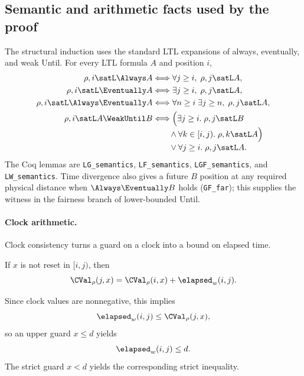 \subsection{Semantic and arithmetic facts used by the proof}
\label{subsec:main-proof-facts}
The structural induction uses the standard LTL expansions of always,
eventually, and weak Until. For every LTL formula $A$ and position $i$,
\begin{align}
\rho,i\satL \Always A &\Longleftrightarrow
  \forall j\ge i,\;\rho,j\satL A,\nonumber\\
\rho,i\satL \Eventually A &\Longleftrightarrow
  \exists j\ge i,\;\rho,j\satL A,\nonumber\\
\rho,i\satL \Always\Eventually A &\Longleftrightarrow
  \forall n\ge i\;\exists j\ge n,\;\rho,j\satL A,\label{eq:main-sem-GF}\\
\rho,i\satL A\WeakUntil B &\Longleftrightarrow
  \Bigl(\exists j\ge i.\;\rho,j\satL B\\[-1mm]
  &\qquad\land\forall k\in[i,j).\;\rho,k\satL A\Bigr)\nonumber\\[-1mm]
  &\qquad\lor\forall j\ge i.\;\rho,j\satL A.\nonumber
\end{align}
The Coq lemmas are \texttt{LG\_semantics}, \texttt{LF\_semantics},
\texttt{LGF\_semantics}, and \texttt{LW\_semantics}. Time divergence also
gives a future $B$ position at any required physical distance when
$\Always\Eventually B$ holds (\texttt{GF\_far}); this supplies the witness
in the fairness branch of lower-bounded Until.

\paragraph{Clock arithmetic.}
Clock consistency turns a guard on a clock into a bound on elapsed time.
\begin{lemma}
\label{lem:clock-accumulation}
If $x$ is not reset in $[i,j)$, then
\[
\CVal_\rho(j,x)=\CVal_\rho(i,x)+\elapsed_w(i,j).
\]
\end{lemma}
Since clock values are nonnegative, this implies
\begin{equation}
\elapsed_w(i,j)\le\CVal_\rho(j,x),
\label{eq:main-preservation-elapsed}
\end{equation}
so an upper guard $x\le d$ yields
\begin{equation}
\elapsed_w(i,j)\le d.
\label{eq:upper-clock}
\end{equation}
The strict guard $x<d$ yields the corresponding strict inequality.

